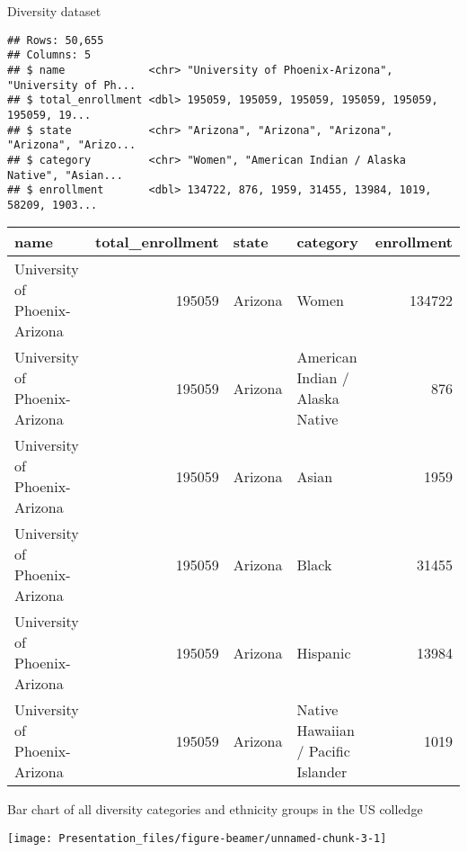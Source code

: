\documentclass[
  ignorenonframetext,
]{beamer}
\newenvironment{Shaded}{\begin{snugshade}}{\end{snugshade}}
\newcommand{\KeywordTok}[1]{\textcolor[rgb]{0.13,0.29,0.53}{\textbf{#1}}}
\newcommand{\NormalTok}[1]{#1}
\newcommand{\OperatorTok}[1]{\textcolor[rgb]{0.81,0.36,0.00}{\textbf{#1}}}
\newcommand{\StringTok}[1]{\textcolor[rgb]{0.31,0.60,0.02}{#1}}
\begin{document}
\begin{frame}[fragile]{Diversity dataset}
\protect\hypertarget{diversity-dataset}{}

\begin{Shaded}
\end{Shaded}

\begin{verbatim}
## Rows: 50,655
## Columns: 5
## $ name             <chr> "University of Phoenix-Arizona", "University of Ph...
## $ total_enrollment <dbl> 195059, 195059, 195059, 195059, 195059, 195059, 19...
## $ state            <chr> "Arizona", "Arizona", "Arizona", "Arizona", "Arizo...
## $ category         <chr> "Women", "American Indian / Alaska Native", "Asian...
## $ enrollment       <dbl> 134722, 876, 1959, 31455, 13984, 1019, 58209, 1903...
\end{verbatim}

\begin{longtable}[]{@{}lrllr@{}}
\toprule
name & total\_enrollment & state & category & enrollment\tabularnewline
\midrule
\endhead
University of Phoenix-Arizona & 195059 & Arizona & Women &
134722\tabularnewline
University of Phoenix-Arizona & 195059 & Arizona & American Indian /
Alaska Native & 876\tabularnewline
University of Phoenix-Arizona & 195059 & Arizona & Asian &
1959\tabularnewline
University of Phoenix-Arizona & 195059 & Arizona & Black &
31455\tabularnewline
University of Phoenix-Arizona & 195059 & Arizona & Hispanic &
13984\tabularnewline
University of Phoenix-Arizona & 195059 & Arizona & Native Hawaiian /
Pacific Islander & 1019\tabularnewline
\bottomrule
\end{longtable}

\end{frame}

\begin{frame}{Bar chart of all diversity categories and ethnicity groups
in the US colledge}
\protect\hypertarget{bar-chart-of-all-diversity-categories-and-ethnicity-groups-in-the-us-colledge}{}

\begin{center}\texttt{[image: Presentation\_files/figure-beamer/unnamed-chunk-3-1]} \end{center}

\end{frame}
\end{document}

